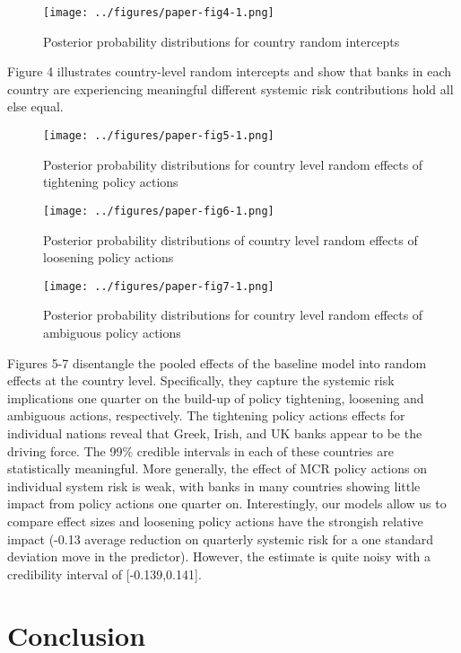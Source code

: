 \documentclass[
  10pt,
]{article}
\begin{document}
\begin{figure}
\centering
\texttt{[image: ../figures/paper-fig4-1.png]}
\caption{Posterior probability distributions for country random
intercepts}
\end{figure}

Figure 4 illustrates country-level random intercepts and show that banks
in each country are experiencing meaningful different systemic risk
contributions hold all else equal.

\begin{figure}
\centering
\texttt{[image: ../figures/paper-fig5-1.png]}
\caption{Posterior probability distributions for country level random
effects of tightening policy actions}
\end{figure}

\begin{figure}
\centering
\texttt{[image: ../figures/paper-fig6-1.png]}
\caption{Posterior probability distributions of country level random
effects of loosening policy actions}
\end{figure}

\begin{figure}
\centering
\texttt{[image: ../figures/paper-fig7-1.png]}
\caption{Posterior probability distributions for country level random
effects of ambiguous policy actions}
\end{figure}

Figures 5-7 disentangle the pooled effects of the baseline model into
random effects at the country level. Specifically, they capture the
systemic risk implications one quarter on the build-up of policy
tightening, loosening and ambiguous actions, respectively. The
tightening policy actions effects for individual nations reveal that
Greek, Irish, and UK banks appear to be the driving force. The 99\%
credible intervals in each of these countries are statistically
meaningful. More generally, the effect of MCR policy actions on
individual system risk is weak, with banks in many countries showing
little impact from policy actions one quarter on. Interestingly, our
models allow us to compare effect sizes and loosening policy actions
have the strongish relative impact (-0.13 average reduction on quarterly
systemic risk for a one standard deviation move in the predictor).
However, the estimate is quite noisy with a credibility interval of
{[}-0.139,0.141{]}.

\hypertarget{conclusion}{%
\section{Conclusion}\label{conclusion}}
\end{document}
